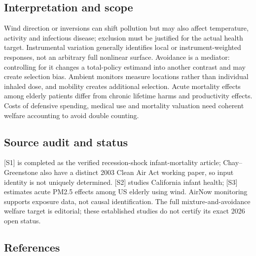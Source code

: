 \documentclass[11pt,a4paper]{article}
\begin{document}
\subsection*{Interpretation and scope}

Wind direction or inversions can shift pollution but may also affect temperature, activity and infectious disease; exclusion must be justified for the actual health target. Instrumental variation generally identifies local or instrument-weighted responses, not an arbitrary full nonlinear surface. Avoidance is a mediator: controlling for it changes a total-policy estimand into another contrast and may create selection bias. Ambient monitors measure locations rather than individual inhaled dose, and mobility creates additional selection. Acute mortality effects among elderly patients differ from chronic lifetime harms and productivity effects. Costs of defensive spending, medical use and mortality valuation need coherent welfare accounting to avoid double counting.

\subsection*{Source audit and status}

[S1] is completed as the verified recession-shock infant-mortality article; Chay--Greenstone also have a distinct 2003 Clean Air Act working paper, so input identity is not uniquely determined. [S2] studies California infant health; [S3] estimates acute PM2.5 effects among US elderly using wind. AirNow monitoring supports exposure data, not causal identification. The full mixture-and-avoidance welfare target is editorial; these established studies do not certify its exact 2026 open status.

\subsection*{References}
\end{document}
